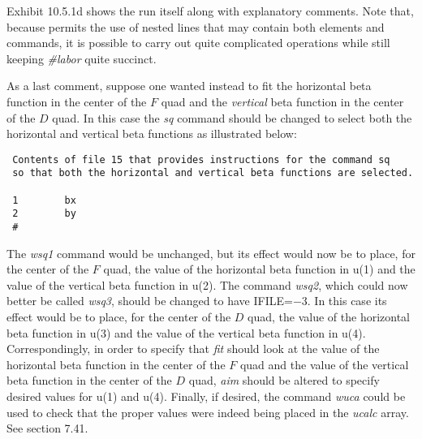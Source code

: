 Exhibit 10.5.1d shows the \Mary run itself along with explanatory
comments.  Note that, because \Mary permits the use of nested lines that
may contain both elements and commands, it is possible to carry out quite
complicated operations while still keeping {\em \#labor} quite succinct.

As a last comment, suppose one wanted instead to fit the horizontal beta
function in the center of the $F$ quad and the {\em vertical} beta
function in the center of the $D$ quad.  In this case the {\em sq}
command should be changed to select both the horizontal and vertical beta
functions as illustrated below:

\begin{footnotesize}
\begin{verbatim}
 Contents of file 15 that provides instructions for the command sq
 so that both the horizontal and vertical beta functions are selected.

 1        bx
 2        by
 #
 \end{verbatim}
 \end{footnotesize}

\noindent The {\em wsq1} command would be
unchanged, but its effect would now be to place, for the center of the
$F$ quad, the value of the horizontal beta function in u(1) and the value
of the vertical beta function in u(2).  The command {\em wsq2}, which
could now better be called {\em wsq3}, should be changed to have
IFILE=$-$3.  In this case its effect would be to place, for the center of
the $D$ quad, the value of the horizontal beta function in u(3) and the
value of the vertical beta function in u(4).  Correspondingly, in order
to specify that {\em fit} should look at the value of the horizontal beta
function in the center of the $F$ quad and the value of the vertical beta
function in the center of the $D$ quad, {\em aim}
should be altered to specify desired values for u(1) and u(4).  Finally,
if desired, the command {\em wuca} could be used to check
that the proper values were indeed being placed in the {\em ucalc} array.
See section 7.41.

